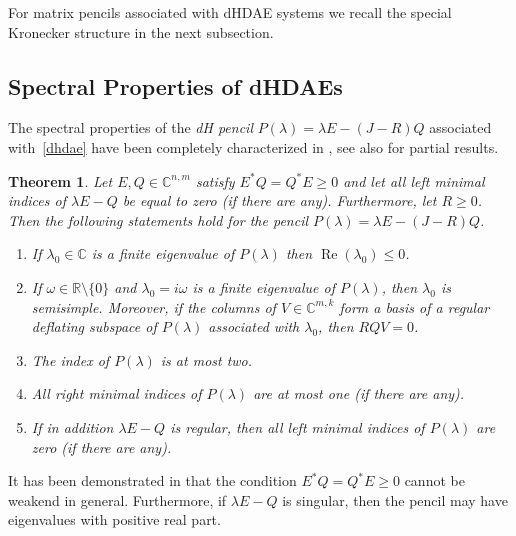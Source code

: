 \documentclass[11pt]{article}
\newtheorem{theorem}{Theorem}
\begin{document}

For matrix pencils associated with
dHDAE systems we recall the  special Kronecker structure in the next subsection.
\subsection{Spectral Properties of dHDAEs}\label{sec:dhdaes}
The spectral properties of the \emph{dH pencil} $P(\lambda)=\lambda E-(J-R)Q$ associated with~\eqref{dhdae} have been completely characterized in \cite{MehMW18}, see also \cite{GilMS18,MehMS16} for partial results.
%
\begin{theorem}\label{thm:singindspec}
Let $E,Q\in \mathbb C^{n,m}$ satisfy $E^* Q=Q^* E\geq 0$ and let all left minimal indices of
$\lambda E-Q$ be equal to zero (if there are any). Furthermore, let $R\geq 0$. Then the following
statements hold for the pencil $P(\lambda)=\lambda E-(J-R)Q$.
%
\begin{enumerate}
\item[\rm (i)] If $\lambda_0\in\mathbb C$ is a finite eigenvalue of $P(\lambda)$ then $\operatorname{Re}(\lambda_0)\leq 0$.
\item[\rm (ii)] If $\omega\in\mathbb R\setminus\{0\}$ and $\lambda_0=i\omega$ is a finite eigenvalue of $P(\lambda)$, then
$\lambda_0$ is semisimple. Moreover, if the columns of $V\in\mathbb C^{m,k}$ form a basis of a regular deflating
subspace of $P(\lambda)$ associated with $\lambda_0$, then $RQV=0$.
\item[\rm (iii)] The index of $P(\lambda)$ is at most two.
\item[\rm (iv)] All right minimal indices of $P(\lambda)$ are at most one (if there are any).
\item[\rm (v)] If in addition $\lambda E-Q$ is regular, then all left minimal indices of $P(\lambda)$ are zero
(if there are any).
\end{enumerate}
\end{theorem}

It has been demonstrated in \cite{MehMW18} that the   condition $E^* Q=Q^* E\geq 0$ cannot be weakend in general. Furthermore, if  $\lambda E-Q$ is singular,  then the pencil may have eigenvalues with positive real part.
\end{document}
